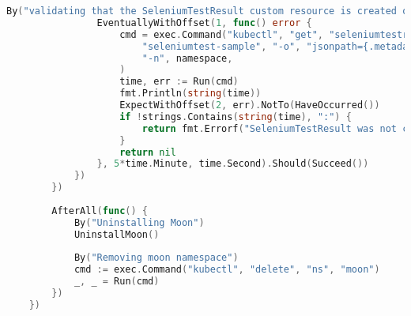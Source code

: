 \begin{lstlisting}[language={Go}]
				By("validating that the SeleniumTestResult custom resource is created or updated")
				EventuallyWithOffset(1, func() error {
					cmd = exec.Command("kubectl", "get", "seleniumtestresult",
						"seleniumtest-sample", "-o", "jsonpath={.metadata.creationTimestamp}",
						"-n", namespace,
					)
					time, err := Run(cmd)
					fmt.Println(string(time))
					ExpectWithOffset(2, err).NotTo(HaveOccurred())
					if !strings.Contains(string(time), ":") {
						return fmt.Errorf("SeleniumTestResult was not created")
					}
					return nil
				}, 5*time.Minute, time.Second).Should(Succeed())
			})
		})
	
		AfterAll(func() {
			By("Uninstalling Moon")
			UninstallMoon()
	
			By("Removing moon namespace")
			cmd := exec.Command("kubectl", "delete", "ns", "moon")
			_, _ = Run(cmd)
		})
	})	
\end{lstlisting}